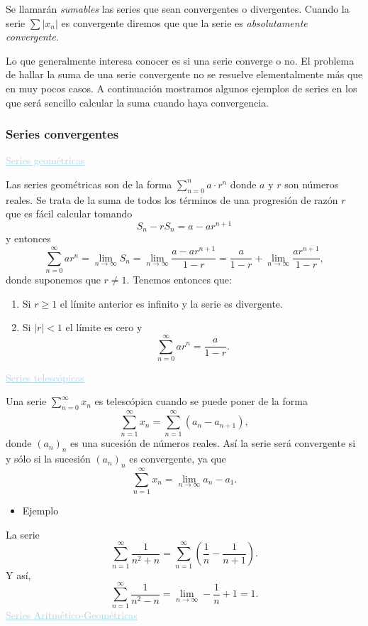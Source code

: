 \documentclass[12pt]{article}
\begin{document}
 Se llamarán \textit{sumables} las series que sean convergentes o divergentes. Cuando la serie $\sum|x_n|$ es convergente diremos que que la serie es \textit{absolutamente convergente}.
 
 Lo que generalmente interesa conocer es si una serie converge o no. El problema de hallar la suma de una serie convergente no se resuelve elementalmente más que en muy pocos casos. A continuación mostramos algunos ejemplos de series en los que será sencillo calcular la suma cuando haya convergencia.
 \subsubsection{Series convergentes}
 \textcolor{lightblue}{\underline{Series geométricas}}
 
 Las series geométricas son de la forma $\sum_{n=0}^{n}a\cdot r^n$ donde $a$ y $r$ son números reales. Se trata de la suma de todos los términos de una progresión de razón $r$ que es fácil calcular tomando \[ S_n-rS_n=a-ar^{n+1} \] y entonces \[ \sum_{n=0}^{\infty}ar^n=\lim_{n\to\infty}S_n=\lim_{n\to\infty}\dfrac{a-ar^{n+1}}{1-r}=\dfrac{a}{1-r}+\lim_{n\to\infty}\dfrac{ar^{n+1}}{1-r}, \]donde suponemos que $r\neq1$. Tenemos entonces que:
 \begin{enumerate}[label=\arabic*)]
 	\item Si $r\ge1$ el límite anterior es infinito y la serie es divergente.
 	\item Si $|r|<1$ el límite es cero y \[ \sum_{n=0}^{\infty}ar^n=\dfrac{a}{1-r}. \]
 \end{enumerate}
 \textcolor{lightblue}{\underline{Series telescópicas}}
 
 Una serie $\sum_{n=0}^{\infty}x_n$ es telescópica cuando se puede poner de la forma \[ \sum_{n=1}^{\infty}x_n=\sum_{n=1}^{\infty}(a_n-a_{n+1}), \] donde $(a_n)_n$ es una sucesión de números reales. Así la serie será convergente si y sólo si la sucesión $(a_n)_n$ es convergente, ya que \[ \sum_{n=1}^{\infty}x_n=\lim_{n\to\infty}a_n-a_1. \]
 
 \begin{itemize}[label=\color{red}\textbullet, leftmargin=*]
 	\item \color{lightblue}Ejemplo
 \end{itemize}
 La serie \[ \sum_{n=1}^{\infty}\dfrac{1}{n^2+n}=\sum_{n=1}^{\infty}\left(\dfrac{1}{n}-\dfrac{1}{n+1}\right). \] Y así, \[ \sum_{n=1}^{\infty}\dfrac{1}{n^2-n}=\lim_{n\to\infty}-\dfrac{1}{n}+1=1. \]
\textcolor{lightblue}{\underline{Series Aritmético-Geométricas}}
\end{document}
